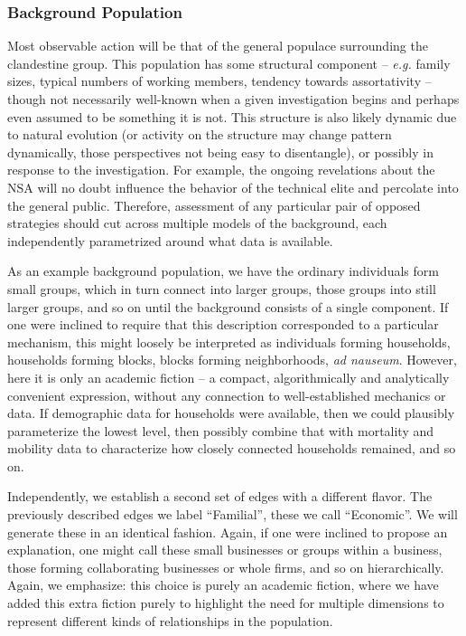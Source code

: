\documentclass{article}
\begin{document}
\subsubsection*{Background Population}
Most observable action will be that of the general populace surrounding the clandestine group.  This population has some structural component -- {\em e.g.} family sizes, typical numbers of working members, tendency towards assortativity -- though not necessarily well-known when a given investigation begins and perhaps even assumed to be something it is not.  This structure is also likely dynamic due to natural evolution (or activity on the structure may change pattern dynamically, those perspectives not being easy to disentangle), or possibly in response to the investigation.  For example, the ongoing revelations about the NSA will no doubt influence the behavior of the technical elite and percolate into the general public.  Therefore, assessment of any particular pair of opposed strategies should cut across multiple models of the background, each independently parametrized around what data is available.

As an example background population, we have the ordinary individuals form small groups, which in turn connect into larger groups, those groups into still larger groups, and so on until the background consists of a single component.  If one were inclined to require that this description corresponded to a particular mechanism, this might loosely be interpreted as individuals forming households, households forming blocks, blocks forming neighborhoods, {\em ad nauseum}.  However, here it is only an academic fiction -- a compact, algorithmically and analytically convenient expression, without any connection to well-established mechanics or data.  If demographic data for households were available, then we could plausibly parameterize the lowest level, then possibly combine that with mortality and mobility data to characterize how closely connected households remained, and so on.

Independently, we establish a second set of edges with a different flavor.  The previously described edges we label ``Familial'', these we call ``Economic''.  We will generate these in an identical fashion.  Again, if one were inclined to propose an explanation, one might call these small businesses or groups within a business, those forming collaborating businesses or whole firms, and so on hierarchically.  Again, we emphasize: this choice is purely an academic fiction, where we have added this extra fiction purely to highlight the need for multiple dimensions to represent different kinds of relationships in the population.
\end{document}
